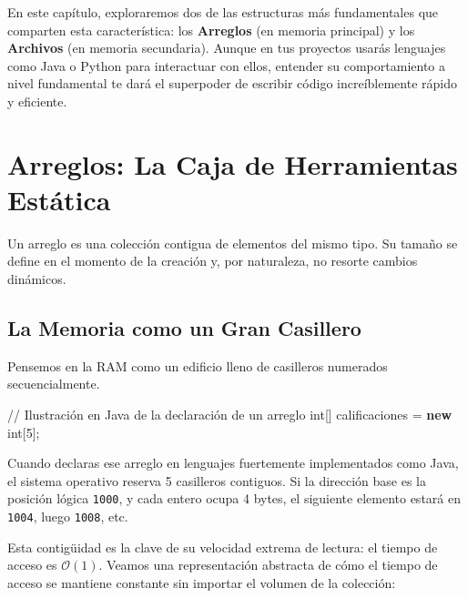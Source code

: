 \documentclass[
  spanish,
  letterpaper,
  DIV=11,
  numbers=noendperiod]{scrreprt}
\newenvironment{Shaded}{\begin{snugshade}}{\end{snugshade}}
\newcommand{\CommentTok}[1]{\textcolor[rgb]{0.37,0.37,0.37}{#1}}
\newcommand{\DataTypeTok}[1]{\textcolor[rgb]{0.68,0.00,0.00}{#1}}
\newcommand{\DecValTok}[1]{\textcolor[rgb]{0.68,0.00,0.00}{#1}}
\newcommand{\KeywordTok}[1]{\textcolor[rgb]{0.00,0.23,0.31}{\textbf{#1}}}
\newcommand{\NormalTok}[1]{\textcolor[rgb]{0.00,0.23,0.31}{#1}}
\newcommand{\OperatorTok}[1]{\textcolor[rgb]{0.37,0.37,0.37}{#1}}
\begin{document}
En este capítulo, exploraremos dos de las estructuras más fundamentales
que comparten esta característica: los \textbf{Arreglos} (en memoria
principal) y los \textbf{Archivos} (en memoria secundaria). Aunque en
tus proyectos usarás lenguajes como Java o Python para interactuar con
ellos, entender su comportamiento a nivel fundamental te dará el
superpoder de escribir código increíblemente rápido y eficiente.

\section{Arreglos: La Caja de Herramientas Estática}\label{sec-arreglos}

Un arreglo es una colección contigua de elementos del mismo tipo. Su
tamaño se define en el momento de la creación y, por naturaleza, no
resorte cambios dinámicos.

\subsection{La Memoria como un Gran
Casillero}\label{la-memoria-como-un-gran-casillero}

Pensemos en la RAM como un edificio lleno de casilleros numerados
secuencialmente.

\begin{Shaded}
\begin{Highlighting}[]
\CommentTok{// Ilustración en Java de la declaración de un arreglo}
\DataTypeTok{int}\OperatorTok{[]}\NormalTok{ calificaciones }\OperatorTok{=} \KeywordTok{new} \DataTypeTok{int}\OperatorTok{[}\DecValTok{5}\OperatorTok{];}
\end{Highlighting}
\end{Shaded}

Cuando declaras ese arreglo en lenguajes fuertemente implementados como
Java, el sistema operativo reserva 5 casilleros contiguos. Si la
dirección base es la posición lógica \texttt{1000}, y cada entero ocupa
4 bytes, el siguiente elemento estará en \texttt{1004}, luego
\texttt{1008}, etc.

Esta contigüidad es la clave de su velocidad extrema de lectura: el
tiempo de acceso es \(\mathcal{O}(1)\). Veamos una representación
abstracta de cómo el tiempo de acceso se mantiene constante sin importar
el volumen de la colección:
\end{document}
